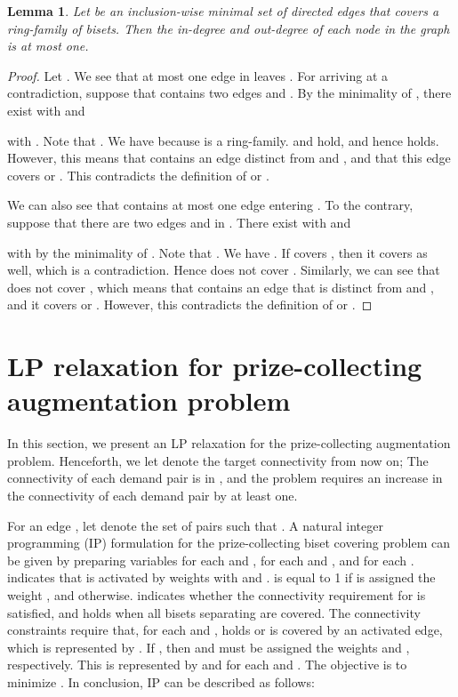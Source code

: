 \documentclass[11pt]{article}
\newtheorem{lemma}{Lemma}
\begin{document}
\begin{lemma}\label{lem.ring-cover}
 Let  be an inclusion-wise minimal set of directed edges 
 that covers a ring-family  of bisets.
 Then the in-degree and out-degree of each node in the graph  
 is at most one.
\end{lemma}
\begin{proof}
 Let .
 We see that at most one edge in  leaves .
 For arriving at a contradiction, suppose that
  contains two edges  and .
 By the minimality of ,
 there exist   
 with  and 
   
 with .
 Note that .
 We have 
 because  is a ring-family.
  and  hold,
 and hence  holds.
 However, this means that  contains
 an edge distinct from  and ,
 and that this edge covers  or .
 This contradicts the definition of  or .

 We can also see that
  contains at most one edge entering .
 To the contrary, suppose that
 there are two edges  and  in .
 There exist   
 with  and 
   
 with  by the minimality of
 .
 Note that .
 We have .
 If  covers ,
 then it covers  as well, which is a contradiction.
 Hence  does not cover .
 Similarly, we can see that  does not cover , which means that  contains
 an edge that is distinct from  and , and it
  covers  or .
 However, this contradicts the definition of  or .
\end{proof}


\section{LP relaxation for prize-collecting augmentation problem}
\label{sec.LP}

In this section, we present an LP relaxation for the prize-collecting
augmentation problem. 
Henceforth, we let  denote the target connectivity from now on; 
The connectivity of each demand pair is  in ,
and the problem
requires an increase in the connectivity of each demand pair by at least one.

For an edge ,
let  denote the set of pairs 
such that 
.
A natural integer programming (IP) formulation for the prize-collecting biset covering
problem can be given by preparing 
variables  for each  and , 
 for each  and , 
and  for each .
 indicates that  is activated 
by weights  with  and .
 is equal to 1 if  is assigned the weight , and  otherwise.
 indicates whether the connectivity requirement for 
is satisfied, and
 holds when
all bisets separating  are covered.
The connectivity constraints require that, for each  and 
, 
 holds or  is
covered by an activated edge, which is represented by 
.
If , then  and  must be assigned the weights  and ,
respectively.
This is represented by  and 
 for each  and .
The objective is to minimize .
In conclusion, IP can be described as follows:
\end{document}

